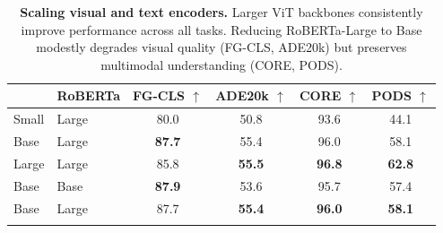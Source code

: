\begin{table}[t]
\centering
\footnotesize
\setlength{\tabcolsep}{6pt}
\begin{threeparttable}
\caption{%
\textbf{Scaling visual and text encoders.}
Larger ViT backbones consistently improve performance across all tasks.
Reducing RoBERTa-Large to Base modestly degrades visual quality (FG-CLS, ADE20k) but preserves multimodal understanding (CORE, PODS).
}
\label{tab:scaling}
\begin{tabular}{@{} l l 
                S[table-format=2.1]
                S[table-format=2.1]
                S[table-format=2.1]
                S[table-format=2.1]@{}}
\toprule
{} & {RoBERTa} 
  & {FG-CLS $\uparrow$}
  & {ADE20k $\uparrow$}
  & {CORE $\uparrow$}
  & {PODS $\uparrow$} \\
\midrule
Small & Large & {80.0} & {50.8} & {93.6} & {44.1} \\
\rowcolor{\methodcolor}
Base & Large & \textbf{87.7} & {55.4} & {96.0} & {58.1} \\
Large & Large & {85.8}  & \textbf{55.5} & \textbf{96.8} & \textbf{62.8} \\
\addlinespace
\midrule
\addlinespace
Base & Base & {\textbf{87.9}}  & {53.6} & {95.7} &  {57.4} \\
\rowcolor{\methodcolor}
Base & Large & {87.7} & \textbf{55.4} & \textbf{96.0} & \textbf{58.1} \\
\rowcolor{\methodcolor}
\bottomrule
\end{tabular}
\end{threeparttable}
\end{table}
